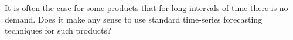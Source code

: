 \begin{exercise}
It is often the case for some products that for long intervals of time there is no demand. Does it make any sense to use standard time-series forecasting techniques for such products?

\end{exercise}


